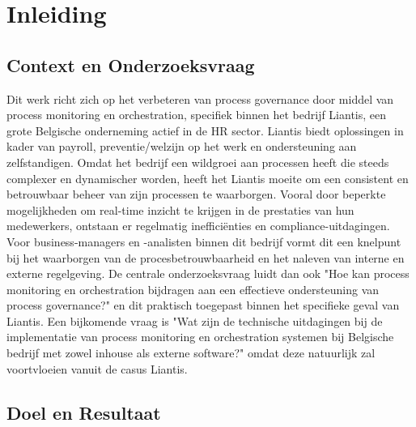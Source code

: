 
\section{Inleiding}%
\label{sec:inleiding}

\subsection{Context en Onderzoeksvraag}

Dit werk richt zich op het verbeteren van process governance door middel van process monitoring en orchestration, specifiek binnen het bedrijf Liantis, een grote Belgische onderneming actief in de HR sector. Liantis biedt oplossingen in kader van payroll, preventie/welzijn op het werk en ondersteuning aan zelfstandigen. Omdat het bedrijf een wildgroei aan processen heeft die steeds complexer en dynamischer worden, heeft het Liantis moeite om een consistent en betrouwbaar beheer van zijn processen te waarborgen. Vooral door beperkte mogelijkheden om real-time inzicht te krijgen in de prestaties van hun medewerkers, ontstaan er regelmatig inefficiënties en compliance-uitdagingen. Voor business-managers en -analisten binnen dit bedrijf vormt dit een knelpunt bij het waarborgen van de procesbetrouwbaarheid en het naleven van interne en externe regelgeving. De centrale onderzoeksvraag luidt dan ook "Hoe kan process monitoring en orchestration bijdragen aan een effectieve ondersteuning van process governance?" en dit praktisch toegepast binnen het specifieke geval van Liantis. Een bijkomende vraag is "Wat zijn de technische uitdagingen bij de implementatie van process monitoring en orchestration systemen bij Belgische bedrijf met zowel inhouse als externe software?" omdat deze natuurlijk zal voortvloeien vanuit de casus Liantis.

\subsection{Doel en Resultaat}

